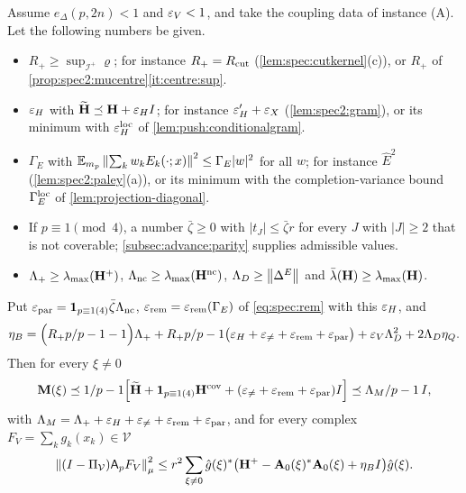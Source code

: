 \begin{lemma}\label{cor:spec2:coupling}
Assume $e_\Delta(p,2n)<1$ and $\varepsilon_V<1$, and take the coupling data of instance
\textup{(A)}. Let the following numbers be given.
\begin{itemize}
\item $R_+\ge\sup_{\mathcal I^+}\varrho$; for instance $R_+=R_{\mathrm{cut}}$
  (\cref{lem:spec:cutkernel}(c)), or $R_+$ of \cref{prop:spec2:mucentre}\ref{it:centre:sup}.
\item $\varepsilon_H$ with $\widetilde{\mathbf H}\preceq\mathbf H+\varepsilon_HI$; for instance $\varepsilon'_H+\varepsilon_X$
  (\cref{lem:spec2:gram}), or its minimum with $\varepsilon^{\rm loc}_H$ of
  \cref{lem:push:conditionalgram}.
\item $\Gamma_E$ with $\mathbb E_{m_p}\left\|\sum_kw_kE_k(\cdot;x)\right\|^2\le\Gamma_E|w|^2$ for all $w$; for
  instance $\hat E^2$ (\cref{lem:spec2:paley}(a)), or its minimum with the
  completion-variance bound $\Gamma^{\rm loc}_E$ of \cref{lem:projection-diagonal}.
\item If $p\equiv1\pmod4$, a number $\bar\zeta\ge0$ with $|t_J|\le\bar\zeta r$ for every
  $J$ with $|J|\ge2$ that is not coverable; \cref{subsec:advance:parity} supplies
  admissible values.
\item $\Lambda_+\ge\lambda_{\max}(\mathbf H^+)$, $\Lambda_{\rm nc}\ge\lambda_{\max}(\mathbf H^{\rm nc})$,
  $\Lambda_D\ge\left\|\Delta^E\right\|$ and $\bar\lambda(\mathbf H)\ge\lambda_{\max}(\mathbf H)$.
\end{itemize}
Put $\varepsilon_{\rm par}=\mathbf 1_{p\equiv1(4)}\bar\zeta\Lambda_{\rm nc}$,
$\varepsilon_{\rm rem}=\varepsilon_{\rm rem}(\Gamma_E)$ of \eqref{eq:spec:rem} with this $\varepsilon_H$, and
\begin{equation}\label{eq:spec:etaB}
  \eta_B=\Big(R_+p/p-1-1\Big)\Lambda_+
  +R_+p/p-1\big(\varepsilon_H+\varepsilon_{\ne}+\varepsilon_{\rm rem}+\varepsilon_{\rm par}\big)
  +\varepsilon_V\Lambda_D^2+2\Lambda_D\eta_Q .
\end{equation}
Then for every $\xi\ne0$
\[
  \mathbf M(\xi)\preceq1/p-1\Big[\widetilde{\mathbf H}+\mathbf 1_{p\equiv1(4)}\mathbf H^{\rm cov}
  +(\varepsilon_{\ne}+\varepsilon_{\rm rem}+\varepsilon_{\rm par})I\Big]\preceq\Lambda_M/p-1\,I,
\]
with $\Lambda_M=\Lambda_++\varepsilon_H+\varepsilon_{\ne}+\varepsilon_{\rm rem}+\varepsilon_{\rm par}$, and for every complex
$F_V=\sum_kg_k(x_k)\in\mathcal V$
\begin{equation}\label{eq:spec:coupling}
  \left\|(I-\Pi_{\mathcal V})\mathsf A_p F_V\right\|^2_\mu\le r^2\sum_{\xi\ne0}\hat g(\xi)^*
  \big(\mathbf H^+-\mathbf A_{0}(\xi)^*\mathbf A_{0}(\xi)+\eta_BI\big)\hat g(\xi).
\end{equation}
\end{lemma}


